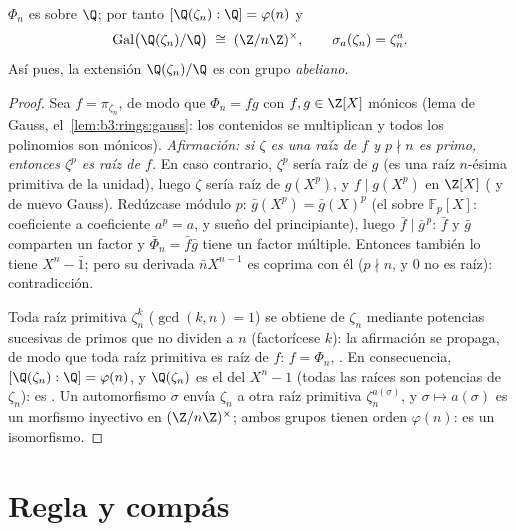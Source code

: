 \begin{theorem}\label{thm:b3:galois:cyclotomicirred}
$\Phi_n$ es  sobre $\Q$;
por tanto $[\Q(\zeta_n) : \Q] =
\varphi(n)$ y
\[
\operatorname{Gal}\bigl(\Q(\zeta_n)/\Q\bigr) \;\cong\;
(\Z/n\Z)^\times,
\qquad \sigma_a(\zeta_n) = \zeta_n^a .
\]
Así pues, la extensión $\Q(\zeta_n)/\Q$ es
 con grupo \emph{abeliano}.
\end{theorem}

\begin{proof}
Sea $f = \pi_{\zeta_n}$, de modo que $\Phi_n = fg$ con $f, g \in \Z[X]$
mónicos (lema de Gauss, el~\cref{lem:b3:rings:gauss}: los contenidos se
multiplican y todos los polinomios son mónicos). \emph{Afirmación: si
$\zeta$ es una raíz de $f$ y $p \nmid n$ es primo, entonces $\zeta^p$ es
raíz de $f$.} En caso contrario, $\zeta^p$ sería raíz de $g$ (es una
raíz $n$-ésima primitiva de la unidad), luego $\zeta$ sería raíz de
$g(X^p)$, y $f
\mid g(X^p)$ en $\Z[X]$ ( y de nuevo Gauss). Redúzcase módulo $p$:
$\bar g(X^p) = \bar g(X)^p$ (el
 sobre $\mathbb F_p[X]$:
coeficiente a coeficiente $a^p = a$, y sueño del principiante), luego
$\bar f \mid \bar g^{\,p}$: $\bar f$ y $\bar g$ comparten un factor
 y
$\bar\Phi_n = \bar f\bar g$ tiene un factor múltiple. Entonces también
lo tiene $X^n - \bar 1$; pero su derivada $\bar nX^{n-1}$ es coprima con
él ($p \nmid n$, y $0$ no es raíz): contradicción.

Toda raíz primitiva $\zeta_n^k$ ($\gcd(k, n) = 1$) se obtiene de
$\zeta_n$ mediante potencias sucesivas de primos que no dividen a $n$
(factorícese $k$): la afirmación se propaga, de modo que toda raíz
primitiva es raíz de $f$: $f = \Phi_n$,
. En consecuencia,
$[\Q(\zeta_n):\Q] = \varphi(n)$, y $\Q(\zeta_n)$ es el
 del
 $X^n - 1$ (todas las raíces
son potencias de $\zeta_n$): es . Un automorfismo $\sigma$ envía $\zeta_n$ a otra raíz primitiva
$\zeta_n^{a(\sigma)}$, y $\sigma
\mapsto a(\sigma)$ es un morfismo inyectivo en $(\Z/n\Z)^\times$; ambos
grupos tienen orden $\varphi(n)$: es un isomorfismo.
\end{proof}

\section{Regla y compás}

